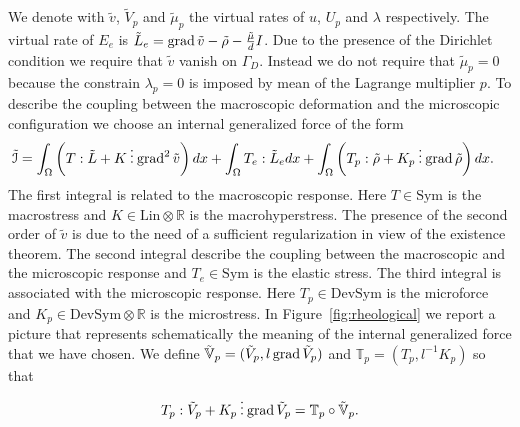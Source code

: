 We denote with $\tilde v$, $\tilde V_p$ and $\tilde\mu_p$ the virtual rates of $u$, $U_p$ and $\lambda$ respectively. The virtual rate of $E_e$ is $\tilde L_e=\operatorname{grad}\tilde v-\tilde\rho-\frac{\tilde\mu}{d}I$. Due to the presence of the Dirichlet condition we require that $\tilde v$ vanish on $\Gamma_D$. Instead we do not require that $\tilde\mu_p=0$ because the constrain $\lambda_p=0$ is imposed by mean of the Lagrange multiplier $p$. To describe the coupling between the macroscopic deformation and the microscopic configuration we choose an internal generalized force of the form
\[
\begin{split}
\tilde{\mathcal{I}}&=\int_\Omega\left(T:\tilde L+K\mathbin{\vdots}\operatorname{grad}^2\tilde v\right)dx+\int_\Omega T_e:\tilde L_edx+\int_\Omega\left(T_p:\tilde\rho+K_p\mathbin{\vdots}\operatorname{grad}\tilde\rho\right)dx.
\end{split}
\]
The first integral is related to the macroscopic response. Here $T\in\text{Sym}$ is the macrostress and $K\in\text{Lin}\otimes\mathbb{R}$ is the macrohyperstress. The presence of the second order of $\tilde v$ is due to the need of a sufficient regularization in view of the existence theorem. The second integral describe the coupling between the macroscopic and the microscopic response and $T_e\in\text{Sym}$ is the elastic stress. The third integral is associated with the microscopic response. Here $T_p\in\text{DevSym}$ is the microforce and $K_p\in\text{DevSym}\otimes\mathbb{R}$ is the microstress. In Figure~\ref{fig:rheological} we
report a picture that represents schematically the meaning of the internal generalized force
that we have chosen. We define $\tilde{\mathbb{V}}_p=(\tilde V_p,l\operatorname{grad}\tilde V_p)$ and $\mathbb{T}_p=(T_p,l^{-1}K_p)$ so that
\[
T_p:\tilde V_p+K_p\mathbin{\vdots}\operatorname{grad}\tilde V_p=\mathbb{T}_p\circ\tilde{\mathbb{V}}_p.
\]
